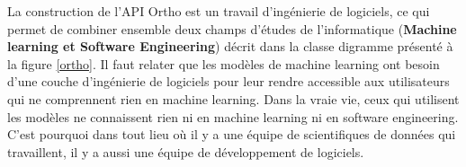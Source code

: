 \documentclass[12pt, french]{report}
\begin{document}
%
%

La construction de l'API Ortho est un travail d'ingénierie de logiciels, ce qui permet de combiner ensemble deux champs d'études de l'informatique (\textbf{Machine learning et Software Engineering}) décrit dans la classe digramme présenté à la figure \ref{ortho}. Il faut relater que les modèles de machine learning ont besoin d'une couche d'ingénierie de logiciels pour leur rendre accessible aux utilisateurs qui ne comprennent rien en machine learning. Dans la vraie vie, ceux qui utilisent les modèles ne connaissent rien ni en machine learning ni en software engineering. C'est pourquoi dans tout lieu où il y a une équipe de scientifiques de données qui travaillent, il y a aussi une équipe de développement de logiciels.
\end{document}
